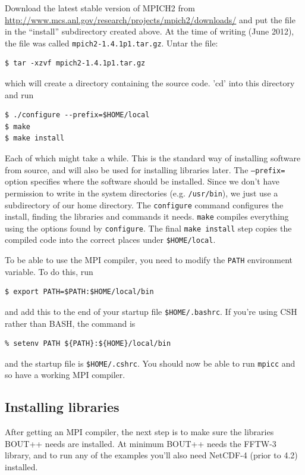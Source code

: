 \documentclass[12pt]{article}
\begin{document}
Download the latest stable version of MPICH2 from \url{http://www.mcs.anl.gov/research/projects/mpich2/downloads/} and put the file in the ``install'' subdirectory created above. At the time of writing (June 2012), the file was 
called \texttt{mpich2-1.4.1p1.tar.gz}. Untar the file:
\begin{verbatim}
$ tar -xzvf mpich2-1.4.1p1.tar.gz
\end{verbatim}
which will create a directory containing the source code. 'cd' into this directory and run
\begin{verbatim}
$ ./configure --prefix=$HOME/local
$ make
$ make install
\end{verbatim}
Each of which might take a while. This is the standard way of installing software from source, and will also be used for installing libraries later. The \texttt{--prefix=} option specifies
where the software should be installed. Since we don't have permission
to write in the system directories (e.g. \texttt{/usr/bin}), we just use a subdirectory of our home directory. The \texttt{configure} command configures the
install, finding the libraries and commands it needs. \texttt{make} compiles everything using the options found by \texttt{configure}. The final \texttt{make install} step copies the compiled code into the correct places under \texttt{\$HOME/local}. 

To be able to use the MPI compiler, you need to modify the \texttt{PATH}
environment variable. To do this, run
\begin{verbatim}
$ export PATH=$PATH:$HOME/local/bin
\end{verbatim}
and add this to the end of your startup file \texttt{\$HOME/.bashrc}. If you're using CSH rather than BASH, the command is
\begin{verbatim}
% setenv PATH ${PATH}:${HOME}/local/bin
\end{verbatim}
and the startup file is \texttt{\$HOME/.cshrc}. You should now be able to run
\texttt{mpicc} and so have a working MPI compiler.

\subsection{Installing libraries}
\label{sec:libraries}

After getting an MPI compiler, the next step is to make sure the
libraries BOUT++ needs are installed. At minimum BOUT++ needs the FFTW-3
library, and to run any of the examples you'll also need NetCDF-4 (prior to 4.2) installed. 
\end{document}
